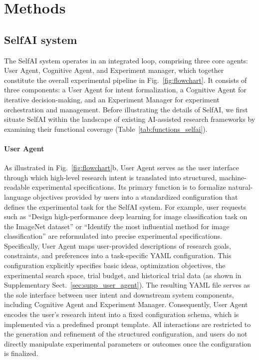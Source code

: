 
\section{Methods}

\subsection{SelfAI system}
\label{sec:method}
The SelfAI system operates in an integrated loop, comprising three core agents: User Agent, Cognitive Agent, and Experiment manager, which together constitute the overall experimental pipeline in Fig.~\ref{fig:flowchart}. It consists of three components: a User Agent for intent formalization, a Cognitive Agent for iterative decision-making, and an Experiment Manager for experiment orchestration and management. Before illustrating the details of SelfAI, we first situate SelfAI within the landscape of existing AI-assisted research frameworks by examining their functional coverage (Table~\ref{tab:functions_selfai}).

\paragraph{User Agent}
As illustrated in Fig.~\ref{fig:flowchart}b, User Agent serves as the user interface through which high-level research intent is translated into structured, machine-readable experimental specifications. Its primary function is to formalize natural-language objectives provided by users into a standardized configuration that defines the experimental task for the SelfAI system. For example, user requests such as “Design high-performance deep learning for image classification task on the ImageNet dataset” or “Identify the most influential method for image classification” are reformulated into precise experimental specifications. Specifically, User Agent maps user-provided descriptions of research goals, constraints, and preferences into a task-specific YAML configuration. This configuration explicitly specifies basic ideas, optimization objectives, the experimental search space, trial budget, and historical trial data (as shown in Supplementary Sect.~\ref{sec:supp_user_agent}). The resulting YAML file serves as the sole interface between user intent and downstream system components, including Cognitive Agent and Experiment Manager. Consequently, User Agent encodes the user’s research intent into a fixed configuration schema, which is implemented via a predefined prompt template. All interactions are restricted to the generation and refinement of the structured configuration, and users do not directly manipulate experimental parameters or outcomes once the configuration is finalized. 


